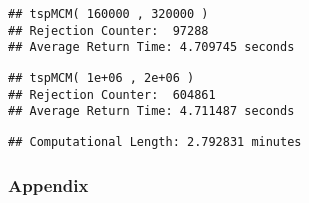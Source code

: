 \documentclass[
]{article}
\begin{document}
\begin{verbatim}
## tspMCM( 160000 , 320000 ) 
## Rejection Counter:  97288 
## Average Return Time: 4.709745 seconds
\end{verbatim}

\begin{verbatim}
## tspMCM( 1e+06 , 2e+06 ) 
## Rejection Counter:  604861 
## Average Return Time: 4.711487 seconds
\end{verbatim}

\begin{verbatim}
## Computational Length: 2.792831 minutes
\end{verbatim}

\hypertarget{appendix}{%
\subsubsection{Appendix}\label{appendix}}
\end{document}
